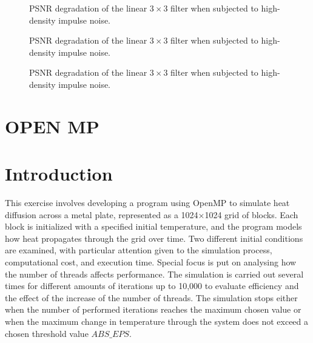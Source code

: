 \documentclass[conference]{IEEEtran}
\numberwithin{figure}{section}
\numberwithin{table}{section}
\begin{document}
\begin{figure}[htbp]
    \centering
    
    \caption{PSNR degradation of the linear $3\times3$ filter when subjected to high-density impulse noise.}
    \label{fig:psnr_degradation_2}
\end{figure}

\begin{figure}[htbp]
    \centering
    
    \caption{PSNR degradation of the linear $3\times3$ filter when subjected to high-density impulse noise.}
    \label{fig:psnr_degradation_3}
\end{figure}

\begin{figure}[htbp]
    \centering
    
    \caption{PSNR degradation of the linear $3\times3$ filter when subjected to high-density impulse noise.}
    \label{fig:psnr_degradation_2060}
\end{figure}


\clearpage
\newpage
\section{OPEN MP}
\section*{Introduction}
This exercise involves developing a program using OpenMP to simulate heat diffusion across a metal plate, represented as a 1024×1024 grid of blocks. Each block is initialized with a specified initial temperature, and the program models how heat propagates through the grid over time. Two different initial conditions are examined, with particular attention given to the simulation process, computational cost, and execution time. Special focus is put on analysing how the number of threads affects performance. The simulation is carried out several times for different amounts of iterations up to 10,000 to evaluate efficiency and the effect of the increase of the number of threads. The simulation stops either when the number of performed iterations reaches the maximum chosen value or when the maximum change in temperature through the system does not exceed a chosen threshold value $ABS\_EPS$.
\end{document}
